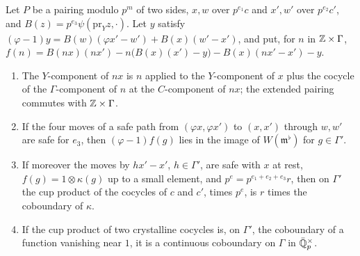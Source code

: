\begin{lemma}\label{lem:cup-cochain}
Let $P$ be a pairing modulo $p^m$ of two sides, $x,w$ over $p^{e_1}c$ and $x',w'$ over $p^{e_2}c'$, and $B(z)=p^{e_3}\psi(\mathrm{pr}_Yz,\cdot)$. Let $y$ satisfy $(\varphi-1)y=B(w)(\varphi x'-w')+B(x)(w'-x')$, and put, for $n$ in $\mathbb{Z}\times\Gamma$,
$f(n)=B(nx)(nx')-n\bigl(B(x)(x')-y\bigr)-B(x)(nx'-x')-y$.
\begin{enumerate}[label=\textup{(\alph*)}]
\item The $Y$-component of $nx$ is $n$ applied to the $Y$-component of $x$ plus the cocycle of the $\Gamma$-component of $n$ at the $C$-component of $nx$; the extended pairing commutes with $\mathbb{Z}\times\Gamma$.
\item If the four moves of a safe path from $(\varphi x,\varphi x')$ to $(x,x')$ through $w,w'$ are safe for $e_3$, then $(\varphi-1)f(g)$ lies in the image of $W(\mathfrak m^\flat)$ for $g\in\Gamma'$.
\item If moreover the moves by $hx'-x'$, $h\in\Gamma'$, are safe with $x$ at rest, $f(g)=1\otimes\kappa(g)$ up to a small element, and $p^e=p^{e_1+e_2+e_3}r$, then on $\Gamma'$ the cup product of the cocycles of $c$ and $c'$, times $p^e$, is $r$ times the coboundary of $\kappa$.
\item If the cup product of two crystalline cocycles is, on $\Gamma'$, the coboundary of a function vanishing near $1$, it is a continuous coboundary on $\Gamma$ in $\bar{\mathbb{Q}}_p^\times$.
\end{enumerate}
\end{lemma}


